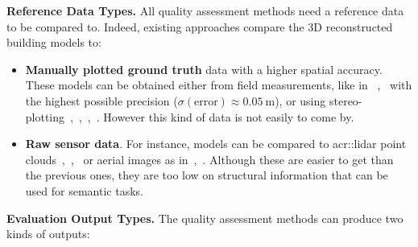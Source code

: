 \documentclass[runningheads]{llncs}
\begin{document}
\noindent
\textbf{Reference Data Types.}
All quality assessment methods need a reference data to be compared to. Indeed, existing approaches compare the 3D reconstructed building models to:
\begin{itemize}
    \item \textbf{Manually plotted ground truth} data with a higher spatial accuracy. These models can be obtained either from field measurements, like in ~\cite{dick2004modelling},~\cite{Kaartinen2005} with the highest possible precision ($\sigma(\text{error}) \approx \SI{0.05}{\meter}$), or using stereo-plotting~\cite{jaynes2003recognition},~\cite{Kaartinen2005},~\cite{zebedin2008fusion},~\cite{Zeng2014}. However this kind of data is not easily to come by.
    \item \textbf{Raw sensor data}. For instance, models can be compared to \acrfull{acr::lidar} point clouds~\cite{Akca2010},~\cite{lafarge2012creating},~\cite{li2016boxfitting} or aerial images as in~\cite{boudet2006supervised},~\cite{Michelin2013}. Although these are easier to get than the previous ones, they are too low on structural information that can be used for semantic tasks.
\end{itemize}
\noindent
\textbf{Evaluation Output Types.}
The quality assessment methods can produce two kinds of outputs:
\end{document}
